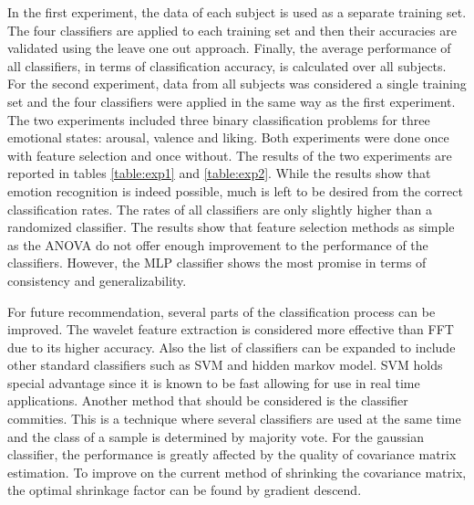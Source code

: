 \documentclass[12pt, a4paper, fleqn]{memoir}%
\begin{document}
In the first experiment, the data of each subject is used as a separate training set. The four classifiers are applied to each training set and then their accuracies are validated using the leave one out approach. Finally, the average performance of all classifiers, in terms of classification accuracy, is calculated over all subjects. For the second experiment, data from all subjects was considered a single training set and the four classifiers were applied in the same way as the first experiment. The two experiments included three binary classification problems for three emotional states: arousal, valence and liking. Both experiments were done once with feature selection and once without. The results of the two experiments are reported in tables \ref{table:exp1} and \ref{table:exp2}. While the results show that emotion recognition is indeed possible, much is left to be desired from the correct classification rates. The rates of all classifiers are only slightly higher than a randomized classifier. The results show that feature selection methods as simple as the ANOVA do not offer enough improvement to the performance of the classifiers. However, the MLP classifier shows the most promise in terms of consistency and generalizability.

For future recommendation, several parts of the classification process can be improved. The wavelet feature extraction is considered more effective than FFT due to its higher accuracy. Also the list of classifiers can be expanded to include other standard classifiers such as SVM and hidden markov model. SVM holds special advantage since it is known to be fast allowing for use in real time applications. Another method that should be considered is the classifier commities. This is a technique where several classifiers are used at the same time and the class of a sample is determined by majority vote. For the gaussian classifier, the performance is greatly affected by the quality of covariance matrix estimation. To improve on the current method of shrinking the covariance matrix, the optimal shrinkage factor can be found by gradient descend. 

{\small}

\appendix
\appendixpage*
\end{document}
